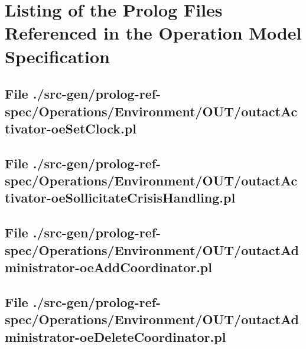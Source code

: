 \chapter{Listing of the Prolog Files Referenced in the Operation Model Specification}

\section[File /src-gen/prolog-ref-spec/Operations.../outactActivator-oeSetClock.pl]{File ./src-gen/prolog-ref-spec/Operations/Environment/OUT/outactActivator-oeSetClock.pl}
\scriptsize

\normalsize
	
\section[File /src-gen/prolog-ref-spec.../outactActivator-oeSollicitateCrisisHandling.pl]{File ./src-gen/prolog-ref-spec/Operations/Environment/OUT/outactActivator-oeSollicitateCrisisHandling.pl}
\scriptsize

\normalsize
	
\section[File /src-gen/prolog-ref-spec.../outactAdministrator-oeAddCoordinator.pl]{File ./src-gen/prolog-ref-spec/Operations/Environment/OUT/outactAdministrator-oeAddCoordinator.pl}
\scriptsize

\normalsize
	
\section[File /src-gen/prolog-ref-spec.../outactAdministrator-oeDeleteCoordinator.pl]{File ./src-gen/prolog-ref-spec/Operations/Environment/OUT/outactAdministrator-oeDeleteCoordinator.pl}
\scriptsize

\normalsize
	
